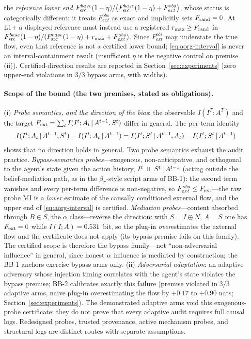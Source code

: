 the \emph{reference lower end}
$F_{\mathrm{src}}^{base}(1-\eta)/\bigl(F_{\mathrm{src}}^{base}(1-\eta)+F_{ext}^{obs}\bigr)$,
whose status is categorically different: it treats $F_{ext}^{obs}$ as exact
and implicitly sets $F_{\mathrm{rand}}=0$. At L1+ a displayed reference must instead use
a registered $r_{\max}\ge F_{\mathrm{rand}}$ in
$F_{\mathrm{src}}^{base}(1-\eta)/(F_{\mathrm{src}}^{base}(1-\eta)+r_{\max}+F_{ext}^{obs})$.
Since $F_{ext}^{obs}$ may understate the true flow, even that reference is not
a certified lower bound; \eqref{eq:aorg-interval} is never an
interval-containment result (insufficient $\eta$ is the negative control on
premise (ii)). Certified-direction results are reported in
Section~\ref{sec:experiments} (zero upper-end violations in $3/3$ bypass arms,
with widths).

\paragraph{Scope of the bound (the two premises, stated as obligations).}
(i) \emph{Probe semantics, and the direction of the bias}: the observable
$I(I^T;A^T)$ and the target
$F_{\mathrm{ext}}=\sum_t I(I^t;A_t\,|\, A^{t-1},S^t)$ differ in general. The per-term
identity
\[
I(I^t;A_t\,|\, A^{t-1},S^t)-I(I^t;A_t\,|\, A^{t-1})
= I(I^t;S^t\,|\, A^{t-1},A_t)-I(I^t;S^t\,|\, A^{t-1})
\]
shows that no direction holds in general. Two probe semantics exhaust the
audit practice. \emph{Bypass-semantics probes}---exogenous, non-anticipative,
and orthogonal to the agent's state given the action history,
$I^t\perp\!\!\!\perp S^t\,|\, A^{t-1}$ (acting outside the belief-mediation path, as in
the $\beta_\pi$-style script arms of BB-1): the second term vanishes and every
per-term difference is non-negative, so $F_{ext}^{obs}\le F_{\mathrm{ext}}$---the raw
probe MI is a \emph{lower} estimate of the causally conditioned external flow,
and the upper end of \eqref{eq:aorg-interval} is certified. \emph{Mediation
probes}---content absorbed through $B\in S$, the $\alpha$ class---reverse the
direction: with $S=I\oplus N$, $A=S$ one has $F_{\mathrm{ext}}=0$ while $I(I;A)=0.531$~bit,
so the plug-in \emph{over}estimates the external flow and the certificate does
not apply (its bypass premise fails on this family). The certified scope is
therefore the bypass family---not ``non-adversarial influence'' in general,
since honest $\alpha$ influence is mediated by construction; the BB-1 anchors
exercise bypass arms only. (ii) \emph{Adversarial adaptation}: an adaptive
adversary whose injection timing correlates with the agent's state violates
the bypass premise; BB-2 calibrates exactly this failure (premise violated in
$3/3$ adaptive arms, naive plug-in overestimating the flow by $+0.17$ to
$+0.90$ nats; Section~\ref{sec:experiments}). The demonstrated adaptive arms
void this exogenous-probe certificate; they do not prove that every adaptive
audit requires full causal logs. Redesigned probes, trusted provenance, active
mechanism probes, and structural logs are distinct routes with separate
assumptions.

